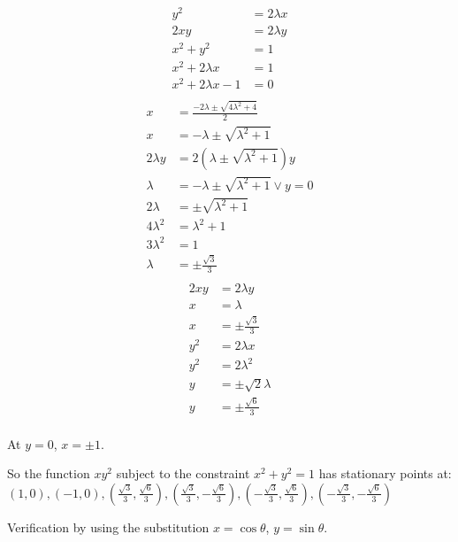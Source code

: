 \documentclass[10pt,\jkfside,a4paper]{article}
\begin{document}
\begin{enumerate}
\begin{enumerate}
\begin{equation}
\begin{split}
y^{2} &= 2\lambda x \\
2xy &= 2 \lambda y \\
x^{2} + y^{2} &= 1 \\
x^{2} + 2\lambda x &= 1 \\
x^{2} + 2\lambda x - 1 &= 0 \\
\end{split}
\end{equation}
\begin{equation}
\begin{split}
x &= \frac{-2\lambda \pm \sqrt{4\lambda^2 + 4}}{2} \\
x &= -\lambda \pm \sqrt{\lambda^2 + 1} \\
2\lambda y &= 2(\lambda \pm \sqrt{\lambda^2 + 1}) y \\
\lambda &= -\lambda \pm \sqrt{\lambda^2 + 1} \vee y = 0\\
2\lambda &= \pm \sqrt{\lambda^2 + 1} \\
4\lambda^2 &= \lambda^2 + 1 \\
3\lambda^2 &= 1 \\
\lambda &= \pm\frac{\sqrt{3}}{3} \\
\end{split}
\end{equation}
\begin{equation}
\begin{split}
2xy &= 2 \lambda y \\
x &= \lambda \\
x &= \pm \frac{\sqrt{3}}{3} \\
y^{2} &= 2\lambda x \\
y^{2} &= 2\lambda^2 \\
y &= \pm\sqrt{2}\lambda \\
y &= \pm\frac{\sqrt{6}}{3} \\
\end{split}
\end{equation}

At $y = 0$, $x = \pm 1$.

So the function $xy^{2}$ subject to the constraint $x^{2} + y^{2} = 1$ has stationary points at:
$(1, 0), (-1, 0), \left(\frac{\sqrt{3}}{3}, \frac{\sqrt{6}}{3}\right), \left(\frac{\sqrt{3}}{3}, -\frac{\sqrt{6}}{3}\right), \left(-\frac{\sqrt{3}}{3}, \frac{\sqrt{6}}{3}\right), \left(-\frac{\sqrt{3}}{3}, -\frac{\sqrt{6}}{3}\right)$

Verification by using the substitution $x = \cos \theta$, $y = \sin \theta$.


\end{enumerate}
\end{enumerate}
\end{document}
